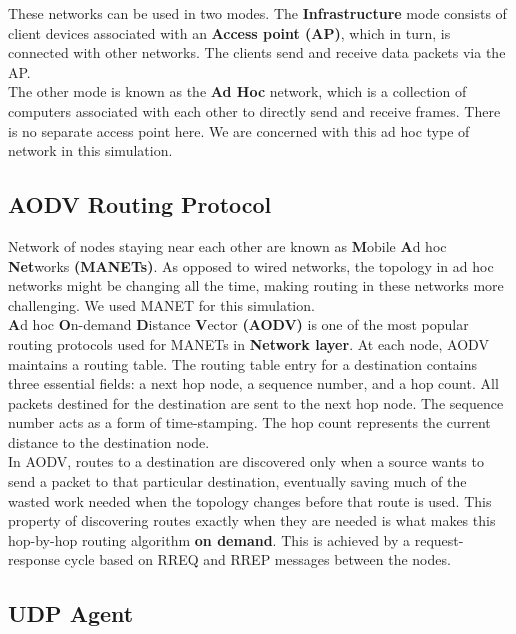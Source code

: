 \documentclass[24pt, a4paper]{article} %
\begin{document}
These networks can be used in two modes. The \textbf{Infrastructure} mode consists of client devices associated with an \textbf{Access point (AP)}, which in turn, is connected with other networks. The clients send and receive data packets via the AP. \\

The other mode is known as the \textbf{Ad Hoc} network, which is a collection of computers associated with each other to directly send and receive frames. There is no separate access point here. We are concerned with this ad hoc type of network in this simulation. 

\subsection{AODV Routing Protocol}

Network of nodes staying near each other are known as \textbf{M}obile \textbf{A}d hoc \textbf{Net}works \textbf{(MANETs)}. As opposed to wired networks, the topology in ad hoc networks might be changing all the time, making routing in these networks more challenging. We used MANET for this simulation. \\

\textbf{A}d hoc \textbf{O}n-demand \textbf{D}istance \textbf{V}ector \textbf{(AODV)} is one of the most popular routing protocols used for MANETs in \textbf{Network layer}. At each node, AODV maintains a routing table. The routing table entry for a destination contains three essential fields: a next hop node, a sequence number, and a hop count. All packets destined for the destination are sent to the next hop node. The sequence number acts as a form of time-stamping. The hop count represents the current distance to the destination node. \\

In AODV, routes to a destination are discovered only when a source wants to send a packet to that particular destination, eventually saving much of the wasted work needed when the topology changes before that route is used. This property of discovering routes exactly when they are needed is what makes this hop-by-hop routing algorithm \textbf{on demand}. This is achieved by a request-response cycle based on RREQ and RREP messages between the nodes. 

\subsection{UDP Agent}
\end{document}
